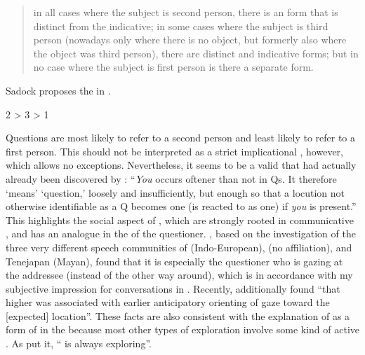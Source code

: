 \begin{quote}
in all cases where the subject is second person, there is an  form that is distinct from the indicative; in some cases where the subject is third person (nowadays only where there is no object, but formerly also where the object was third person), there are distinct  and indicative forms; but in no case where the subject is first person is there a separate  form.
\end{quote}

\newpage 
\noindent Sadock proposes the  in .

\ea\upshape%
    \label{ex:4:55}
    2 > 3 > 1
    \z

\noindent Questions are most likely to refer to a second person and least likely to refer to a first person. This should not be interpreted as a strict implicational , however, which allows no exceptions. Nevertheless, it seems to be a valid  that had actually already been discovered by \citet[3]{Bolinger1957}: “\textit{You} occurs oftener than not in Qs. It therefore ‘means’ ‘question,’ loosely and insufficiently, but enough so that a locution not otherwise identifiable as a Q becomes one (is reacted to as one) if \textit{you} is present.” This highlights the social aspect of , which are strongly rooted in communicative , and has an analogue in the  of the questioner. \citet[239]{RossanoBrownLevinson2009}, based on the investigation of the three very different speech communities of  (Indo-European),  (no affiliation), and Tenejapan  (Mayan), found that it is especially the questioner who is gazing at the addressee (instead of the other way around), which is in accordance with my subjective impression for conversations in . Recently, \citet[81]{BaranesaOudeyerGottlieb2015} additionally found “that higher  was associated with earlier anticipatory orienting of gaze toward the [expected]  location”. These facts are also consistent with the explanation of  as a form of  in the  because most other types of exploration involve some kind of active . As \citet[212]{Gibson1979} put it, “ is always exploring”.